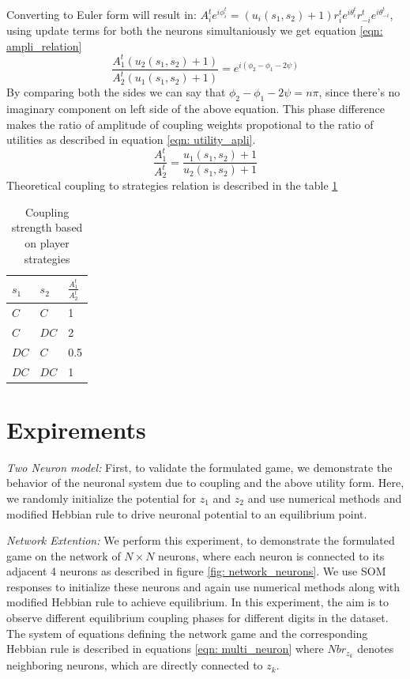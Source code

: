 \documentclass{article}
\begin{document}
Converting to Euler form will result in: $A^t_i e^{i\phi^t_i} = (u_i(s_1, s_2) + 1) r^t_ie^{i\theta^t_i} r^t_{-i}e^{i\theta^t_{-i}}$, using update terms for both the neurons simultaniously we get equation \ref{eqn: ampli_relation}
\begin{equation}
\label{eqn: ampli_relation}
\frac{A_1^t (u_2(s_1, s_2) + 1)}{A_2^t (u_1(s_1, s_2) + 1)} = e^{i(\phi_2 - \phi_1 - 2\psi)}
\end{equation}
By comparing both the sides we can say that $\phi_2 - \phi_1 - 2\psi = n\pi$, since there's no imaginary component on left side of the above equation. This phase difference makes the ratio of amplitude of coupling weights propotional to the ratio of utilities as described in equation \ref{eqn: utility_apli}.
\begin{equation}
\label{eqn: utility_apli}
\frac{A_1^t}{A_2^t} = \frac{u_1(s_1, s_2) + 1}{u_2(s_1, s_2) + 1}
\end{equation}
Theoretical coupling to strategies relation is described in the table \ref{tab: ampli_relation}
\begin{table}
  \caption{Coupling strength based on player strategies}
  \label{tab: ampli_relation}
  \centering
  \begin{tabular}{lll}
    \toprule
    $s_1$     & $s_2$     & $\frac{A^t_1}{A^t_2}$ \\
    \midrule
    $C$       & $C$       & 1   \\
    $C$       & $DC$      & 2   \\
    $DC$      & $C$       & 0.5   \\
    $DC$      & $DC$      & 1   \\
    \bottomrule
  \end{tabular}
\end{table}



\section{Expirements}
\label{exp}

\textit{Two Neuron model:} First, to validate the formulated game, we demonstrate the behavior of the neuronal system due to coupling and the above utility form. Here, we randomly initialize the potential for $z_1$ and $z_2$ and use numerical methods and modified Hebbian rule to drive neuronal potential to an equilibrium point.

\textit{Network Extention:} We perform this experiment, to demonstrate the formulated game on the network of $N\times N$ neurons, where each neuron is connected to its adjacent 4 neurons as described in figure \ref{fig: network_neurons}. We use SOM responses to initialize these neurons and again use numerical methods along with modified Hebbian rule to achieve equilibrium. In this experiment, the aim is to observe different equilibrium coupling phases for different digits in the dataset. The system of equations defining the network game and the corresponding Hebbian rule is described in equations \ref{eqn: multi_neuron} where $Nbr_{z_k}$ denotes neighboring neurons, which are directly connected to $z_k$.
\end{document}
